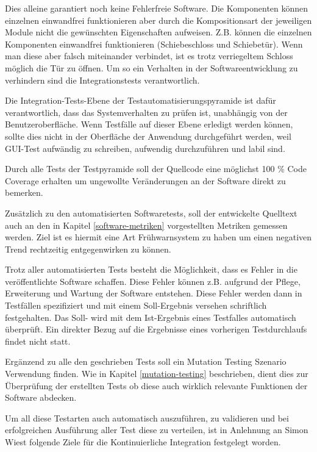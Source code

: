 Dies alleine garantiert noch keine Fehlerfreie Software. Die Komponenten können einzelnen einwandfrei funktionieren aber durch die Kompositionsart der jeweiligen Module nicht die gewünschten Eigenschaften aufweisen. Z.B. können die einzelnen Komponenten einwandfrei funktionieren (Schiebeschloss und Schiebetür). Wenn man diese aber falsch miteinander verbindet, ist es trotz verriegeltem Schloss möglich die Tür zu öffnen. Um so ein Verhalten in der Softwareentwicklung zu verhindern sind die Integrationstests verantwortlich. 

Die Integration-Tests-Ebene der Testautomatisierungspyramide ist dafür verantwortlich, dass das
Systemverhalten zu prüfen ist, unabhängig von der Benutzeroberfläche. Wenn Testfälle auf dieser
Ebene erledigt werden können, sollte dies nicht in der Oberfläche der Anwendung durchgeführt
werden, weil GUI-Test aufwändig zu schreiben, aufwendig durchzuführen und labil sind. 

Durch alle Tests der Testpyramide soll der Quellcode eine möglichst 100 \% Code Coverage erhalten um ungewollte Veränderungen an der Software direkt zu bemerken. 

Zusätzlich zu den automatisierten Softwaretests, soll der entwickelte Quelltext auch an den in Kapitel \ref{software-metriken} vorgestellten Metriken gemessen werden. Ziel ist es hiermit eine Art Frühwarnsystem zu haben um einen negativen Trend rechtzeitig entgegenwirken zu können.

Trotz aller automatisierten Tests besteht die Möglichkeit, dass es Fehler in die veröffentlichte Software schaffen. Diese Fehler können z.B. aufgrund der Pflege, Erweiterung und Wartung der Software entstehen. Diese Fehler werden dann in Testfällen spezifiziert und mit einem Soll-Ergebnis versehen schriftlich festgehalten. Das Soll- wird mit dem Ist-Ergebnis eines Testfalles automatisch überprüft. Ein direkter Bezug auf die Ergebnisse eines vorherigen Testdurchlaufs findet nicht statt.

Ergänzend zu alle den geschrieben Tests soll ein Mutation Testing Szenario Verwendung finden. Wie in Kapitel \ref{mutation-testing} beschrieben, dient dies zur Überprüfung der erstellten Tests ob diese auch wirklich relevante Funktionen der Software abdecken.

Um all diese Testarten auch automatisch auszuführen, zu validieren und bei erfolgreichen Ausführung aller Test diese zu verteilen, ist in Anlehnung an Simon Wiest folgende Ziele für die Kontinuierliche Integration festgelegt worden.


